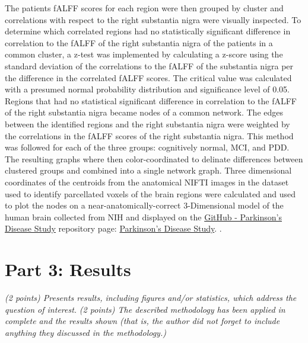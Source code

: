 \documentclass[12pt]{article}
\begin{document}
The patients fALFF scores for each region were then grouped by cluster and correlations with respect to the right substantia nigra were visually inspected. To determine which correlated regions had no statistically significant difference in correlation to the fALFF of the right substantia nigra of the patients in a common cluster, a z-test was implemented by calculating a z-score using the standard deviation of the correlations to the fALFF of the substantia nigra per the difference in the correlated fALFF scores. The critical value was calculated with a presumed normal probability distribution and significance level of 0.05. Regions that had no statistical significant difference in correlation to the fALFF of the right substantia nigra became nodes of a common network. The edges between the identified regions and the right substantia nigra were weighted by the correlations in the fALFF scores of the right substantia nigra. This method was followed for each of the three groups: cognitively normal, MCI, and PDD. The resulting graphs where then color-coordinated to delinate differences between clustered groups and combined into a single network graph. Three dimensional coordinates of the centroids from the anatomical NIFTI images in the dataset used to identify parcellated voxels of the brain regions were calculated and used to plot the nodes on a near-anatomically-correct 3-Dimensional model of the human brain collected from NIH \cite{NIH3DPX021161} and displayed on the \href{https://github.com/efwoods/Parkinson_Disease_Study}{GitHub - Parkinson's Disease Study} repository page: \href{https://efwoods.github.io/Parkinsons_Disease_Study/}{Parkinson's Disease Study}. \cite{WoodsParkinsonsStudy}.

\section{Part 3: Results}
\textit{(2 points) Presents results, including figures and/or statistics, which address the question of interest.}
\textit{(2 points) The described methodology has been applied in complete and the results shown (that is, the author did not forget to include anything they discussed in the methodology.) }
\end{document}
